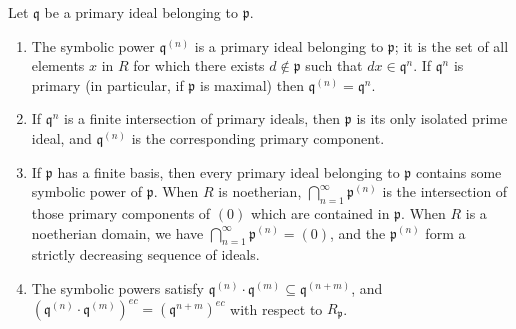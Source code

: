 Let $\mathfrak{q}$ be a primary ideal belonging to $\mathfrak{p}$.

\begin{enumerate}
\item The symbolic power $\mathfrak{q}^{(n)}$ is a primary ideal belonging to $\mathfrak{p}$; it is the set of all elements $x$ in $R$ for which there exists $d \notin \mathfrak{p}$ such that $dx \in \mathfrak{q}^n$. If $\mathfrak{q}^n$ is primary (in particular, if $\mathfrak{p}$ is maximal) then $\mathfrak{q}^{(n)} = \mathfrak{q}^n$.

\item If $\mathfrak{q}^n$ is a finite intersection of primary ideals, then $\mathfrak{p}$ is its only isolated prime ideal, and $\mathfrak{q}^{(n)}$ is the corresponding primary component.

\item If $\mathfrak{p}$ has a finite basis, then every primary ideal belonging to $\mathfrak{p}$ contains some symbolic power of $\mathfrak{p}$. When $R$ is noetherian, $\bigcap_{n=1}^{\infty} \mathfrak{p}^{(n)}$ is the intersection of those primary components of $(0)$ which are contained in $\mathfrak{p}$. When $R$ is a noetherian domain, we have $\bigcap_{n=1}^{\infty} \mathfrak{p}^{(n)} = (0)$, and the $\mathfrak{p}^{(n)}$ form a strictly decreasing sequence of ideals.

\item The symbolic powers satisfy $\mathfrak{q}^{(n)} \cdot \mathfrak{q}^{(m)} \subseteq \mathfrak{q}^{(n+m)}$, and $(\mathfrak{q}^{(n)} \cdot \mathfrak{q}^{(m)})^{ec} = (\mathfrak{q}^{n+m})^{ec}$ with respect to $R_{\mathfrak{p}}$.
\end{enumerate}
